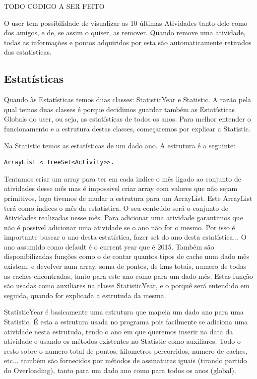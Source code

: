 \documentclass{article}
\begin{document}
TODO CODIGO A SER FEITO
\par O user tem possibilidade de visualizar as 10 últimas Atividades tanto dele como dos amigos, e de, se assim o quiser, as remover. Quando remove uma atividade, todas as informações e pontos adquiridos por esta são automaticamente retirados das estatisticas.


\subsection{Estatísticas}
\quad Quando às Estatísticas temos duas classes: StatisticYear e Statistic.
A razão pela qual temos duas classes é porque decidimos guardar também as Estatísticas Globais do user, ou seja, as estatísticas de todos os anos. Para melhor entender o funcionamento e a estrutura destas classes, começaremos por explicar a Statistic.

\par Na Statistic temos as estatísticas de um dado ano. A estrutura é a seguinte:
\begin{lstlisting} 
ArrayList < TreeSet<Activity>>. 
\end{lstlisting}

Tentamos criar um array para ter em cada indice o mês ligado ao conjunto de atividades desse mês mas é impossivel criar array com valores que não sejam primitivos, logo tivemos de mudar a estrutura para um ArrayList. Este ArrayList terá como indices o mês da estatistica. O seu conteúdo será o conjunto de Atividades realizadas nesse mês. Para adicionar uma atividade garantimos que não é possivel adicionar uma atividade se o ano não for o mesmo. Por isso é importante buscar o ano desta estatística, fazer set do ano desta estatística... O ano assumido como default é o current year que é 2015. Também são disponibilizadas funções como o de contar quantos tipos de cache num dado mês existem, e devolver num array, soma de pontos, de kms totais, numero de todas as caches encontradas, tanto para este ano como para um dado mês. Estas função são usadas como auxiliares na classe StatisticYear, e o porquê será entendido em seguida, quando for explicada a estrutuda da mesma.
\par StatisticYear é basicamente uma estrutura que mapeia um dado ano para uma Statistic. É esta a estrutura usada no programa pois facilmente se adiciona uma atividade nesta estrutuda, tendo o ano em que queremos inserir na data da atividade e usando os métodos existentes no Statistic como auxiliares. Todo o resto sobre o numero total de pontos, kilometros percorridos, numero de caches, etc... também são fornecidos por métodos de assinaturas iguais (tirando partido do Overloading), tanto para um dado ano como para todos os anos (global).
\end{document}
